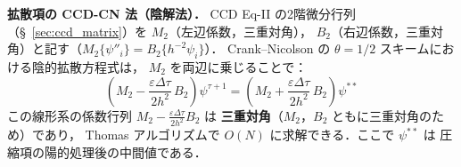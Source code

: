 \medskip
\noindent\textbf{拡散項の CCD-CN 法（陰解法）．}
CCD Eq-II の2階微分行列（§~\ref{sec:ccd_matrix}）を $M_2$（左辺係数，三重対角），
$B_2$（右辺係数，三重対角）と記す（$M_2\{\psi''_i\} = B_2\{h^{-2}\psi_i\}$）．
Crank--Nicolson の $\theta=1/2$ スキームにおける陰的拡散方程式は，
$M_2$ を両辺に乗じることで：
\begin{equation}
  \left(M_2 - \frac{\varepsilon\Delta\tau}{2h^2}\,B_2\right)\psi^{\tau+1}
  = \left(M_2 + \frac{\varepsilon\Delta\tau}{2h^2}\,B_2\right)\psi^{**}
  \label{eq:comp_cn_system}
\end{equation}
この線形系の係数行列 $M_2 - \frac{\varepsilon\Delta\tau}{2h^2}B_2$ は
\textbf{三重対角}（$M_2$，$B_2$ ともに三重対角のため）であり，
Thomas アルゴリズムで $O(N)$ に求解できる．ここで $\psi^{**}$ は
圧縮項の陽的処理後の中間値である．

